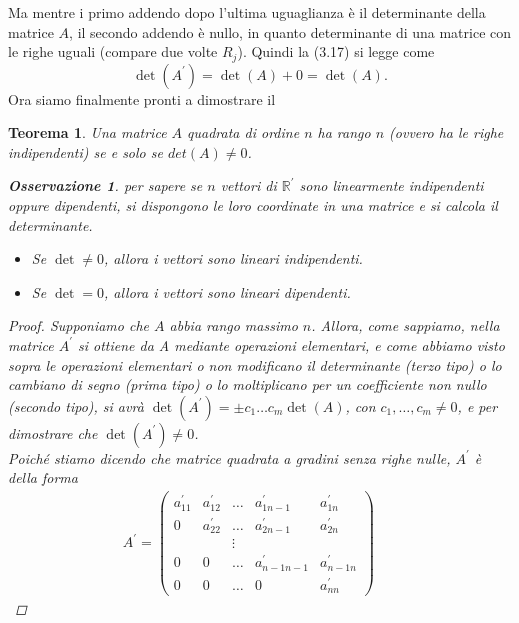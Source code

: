 \documentclass{book}
\newtheorem{teorema}{Teorema}
\newtheorem{osservazione}{Osservazione}
\begin{document}
Ma mentre i primo addendo dopo l'ultima uguaglianza è il determinante della matrice $A$, il
secondo addendo è nullo, in quanto determinante di una matrice con le righe uguali (compare
due volte $R_j$). Quindi la (3.17) si legge come
\begin{equation*}
  \det(A^\prime)=\det(A)+0=\det(A).
\end{equation*}
Ora siamo finalmente pronti a dimostrare il
\begin{teorema}
  Una matrice $A$ quadrata di ordine $n$ ha rango $n$ (ovvero ha le righe indipendenti) se e
  solo se $det (A)\neq 0$.
  \begin{osservazione}
    per sapere se $n$ vettori di $\mathds{R}^\prime$ sono linearmente indipendenti oppure
    dipendenti, si dispongono le loro coordinate in una matrice e si calcola il determinante.
    \begin{itemize}
    \item Se $\det \neq 0$, allora i vettori sono lineari indipendenti.
    \item Se $\det = 0$, allora i vettori sono lineari dipendenti.
    \end{itemize}
  \end{osservazione}
  \begin{proof}
    Supponiamo che $A$ abbia rango massimo $n$. Allora, come sappiamo, nella matrice $A^\prime$ si
    ottiene da A mediante operazioni elementari, e come abbiamo visto sopra le operazioni
    elementari o non modificano il determinante ({\it terzo tipo}) o lo cambiano di segno (prima
    tipo) o lo moltiplicano per un coefficiente non nullo (secondo tipo), si avrà
    $\det(A^\prime)=\pm c_1\dots c_m\det (A)$, con $c_1,\dots,c_m\neq 0$, e per dimostrare che
    $\det(A^\prime)\neq 0$.\\
    Poiché stiamo dicendo che matrice quadrata a gradini senza righe nulle, $A^\prime$ è della
    forma
    \begin{eqnarray*}
      A^\prime=\begin{pmatrix}
                 a^\prime_{11} & a^\prime_{12} & \dots &a^\prime_{1n-1}& a^\prime_{1n}\\
                 0           & a^\prime_{22} & \dots &a^\prime_{2n-1}& a^\prime_{2n}\\
                               && \vdots\\
                 0 & 0 & \dots &a^\prime_{n-1n-1}& a^\prime_{n-1n}\\
                 0 & 0 & \dots & 0 & a^\prime_{nn}
               \end{pmatrix} & \begin{matrix}

\end{matrix}
\end{eqnarray*}
\end{proof}
\end{teorema}
\end{document}
